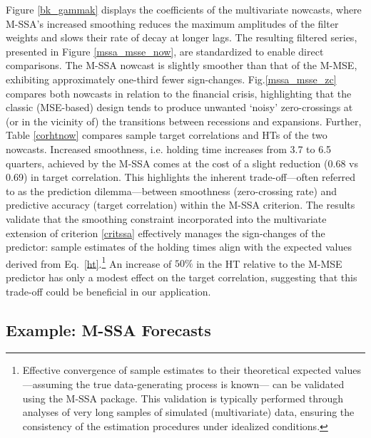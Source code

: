 \documentclass[11pt,a4paper]{article}
\begin{document}
Figure \ref{bk_gammak} displays the coefficients of the multivariate nowcasts, where M-SSA's increased smoothing reduces the maximum amplitudes of the filter weights and slows their rate of decay at longer lags. The resulting filtered series, presented in Figure \ref{mssa_msse_now}, are standardized to enable direct comparisons. The M-SSA nowcast is slightly smoother than that of the M-MSE, exhibiting approximately one-third fewer sign-changes. Fig.\ref{mssa_msse_zc} compares both nowcasts in relation to the financial crisis, highlighting that the classic (MSE-based) design tends to produce unwanted `noisy' zero-crossings at (or in the vicinity of) the transitions between recessions and expansions. Further, Table \ref{corhtnow} compares sample target correlations and HTs of the two nowcasts. Increased smoothness, i.e. holding time increases from 3.7 to 6.5 quarters, achieved by the M-SSA comes at the cost of a slight reduction (0.68 vs 0.69) in target correlation. This highlights the inherent trade-off—often referred to as the prediction dilemma—between smoothness (zero-crossing rate) and predictive accuracy (target correlation) within the M-SSA criterion. 
The results validate that the smoothing constraint incorporated into the multivariate extension of criterion \eqref{critssa} effectively manages the sign-changes of the predictor: sample estimates of the holding times align with the expected values derived from Eq.~\eqref{ht}.\footnote{Effective convergence of sample estimates to their theoretical expected values —assuming the true data-generating process is known— can be validated using the M-SSA package. This validation is typically performed through analyses of very long samples of simulated (multivariate) data, ensuring the consistency of the estimation procedures under idealized conditions.} An increase of $50\%$ in the HT relative to the M-MSE predictor has only a modest effect on the target correlation, suggesting that this trade-off could be beneficial in our application. %


\subsection{Example: M-SSA Forecasts}
\end{document}

